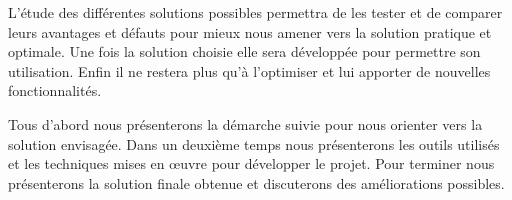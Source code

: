 

L'étude des différentes solutions possibles permettra de les tester et de comparer leurs avantages et défauts pour mieux nous amener vers la solution pratique et optimale.
Une fois la solution choisie elle sera développée pour permettre son utilisation.
Enfin il ne restera plus qu'à l'optimiser et lui apporter de nouvelles fonctionnalités.


Tous d'abord nous présenterons la démarche suivie pour nous orienter vers la solution envisagée.
Dans un deuxième temps nous présenterons les outils utilisés et les techniques mises en œuvre pour développer le projet.
Pour terminer nous présenterons la solution finale obtenue et discuterons des améliorations possibles.
\\
